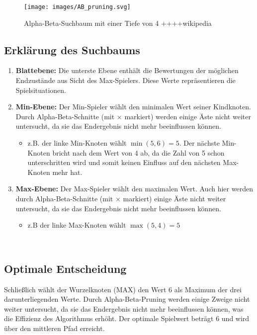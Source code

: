 \begin{figure}[H]
	\centering
	\texttt{[image: images/AB\_pruning.svg]}
	\caption{Alpha-Beta-Suchbaum mit einer Tiefe von 4 ++++wikipedia}
	\label{fig:abpruning}
\end{figure}

\subsection*{Erklärung des Suchbaums}

\begin{enumerate} \item \textbf{Blattebene:} Die unterste Ebene enthält die Bewertungen der möglichen Endzustände aus Sicht des Max-Spielers. Diese Werte repräsentieren die Spielsituationen.
	\item \textbf{Min-Ebene:} Der Min-Spieler wählt den minimalen Wert seiner Kindknoten. Durch Alpha-Beta-Schnitte (mit $\times$ markiert) werden einige Äste nicht weiter untersucht, da sie das Endergebnis nicht mehr beeinflussen können. \begin{itemize} \item z.B. der linke Min-Knoten wählt $\min(5, 6) = 5$. Der nächste Min-Knoten bricht nach dem Wert von 4 ab, da die Zahl von 5 schon unterschritten wird und somit keinen Einfluss auf den nächsten Max-Knoten mehr hat.
    \end{itemize}
	\item \textbf{Max-Ebene:} Der Max-Spieler wählt den maximalen Wert. Auch hier werden durch Alpha-Beta-Schnitte (mit $\times$ markiert) einige Äste nicht weiter untersucht, da sie das Endergebnis nicht mehr beeinflussen können. 
	\begin{itemize} \item z.B der linke Max-Knoten wählt $\max(5, 4) = 5$  
	\end{itemize}
	 \end{enumerate}

\subsection*{Optimale Entscheidung}
Schließlich wählt der Wurzelknoten (MAX) den Wert 6 als Maximum der drei darunterliegenden Werte. Durch Alpha-Beta-Pruning werden einige Zweige nicht weiter untersucht, da sie das Endergebnis nicht mehr beeinflussen können, was die Effizienz des Algorithmus erhöht. Der optimale Spielwert beträgt 6 und wird über den mittleren Pfad erreicht.

